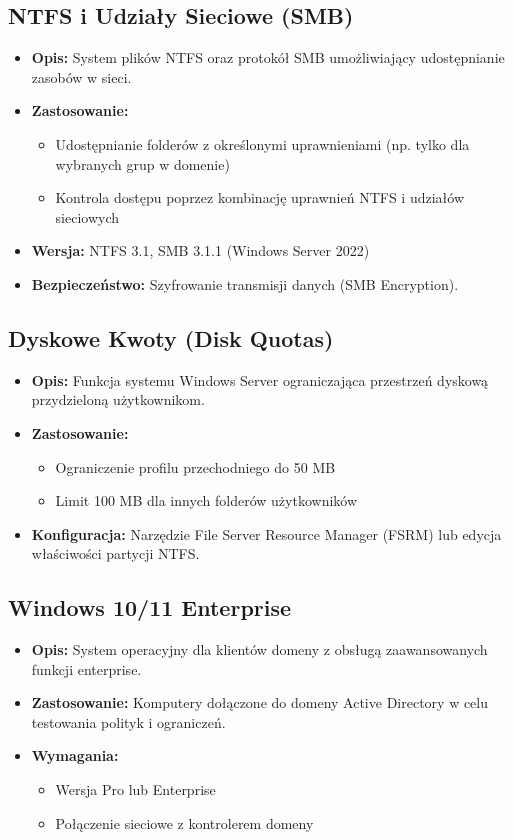 \subsection{NTFS i Udziały Sieciowe (SMB)}
\begin{itemize}
\item \textbf{Opis:} System plików NTFS oraz protokół SMB umożliwiający udostępnianie zasobów w sieci.
\item \textbf{Zastosowanie:}
\begin{itemize}
\item Udostępnianie folderów z określonymi uprawnieniami (np. tylko dla wybranych grup w domenie)
\item Kontrola dostępu poprzez kombinację uprawnień NTFS i udziałów sieciowych
\end{itemize}
\item \textbf{Wersja:} NTFS 3.1, SMB 3.1.1 (Windows Server 2022)
\item \textbf{Bezpieczeństwo:} Szyfrowanie transmisji danych (SMB Encryption).
\end{itemize}

\subsection{Dyskowe Kwoty (Disk Quotas)}
\begin{itemize}
\item \textbf{Opis:} Funkcja systemu Windows Server ograniczająca przestrzeń dyskową przydzieloną użytkownikom.
\item \textbf{Zastosowanie:}
\begin{itemize}
\item Ograniczenie profilu przechodniego do 50 MB
\item Limit 100 MB dla innych folderów użytkowników
\end{itemize}
\item \textbf{Konfiguracja:} Narzędzie File Server Resource Manager (FSRM) lub edycja właściwości partycji NTFS.
\end{itemize}

\subsection{Windows 10/11 Enterprise}
\begin{itemize}
\item \textbf{Opis:} System operacyjny dla klientów domeny z obsługą zaawansowanych funkcji enterprise.
\item \textbf{Zastosowanie:} Komputery dołączone do domeny Active Directory w celu testowania polityk i ograniczeń.
\item \textbf{Wymagania:}
\begin{itemize}
\item Wersja Pro lub Enterprise
\item Połączenie sieciowe z kontrolerem domeny
\end{itemize}
\end{itemize}

